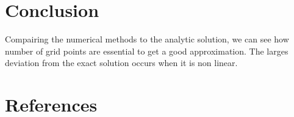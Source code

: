 \documentclass{article}
\begin{document}
\section{Conclusion}
Compairing the numerical methods to the analytic solution, we can see how number of grid points are essential to get a good approximation. The larges deviation from the exact solution occurs when it is non linear. 

\section{References}
\end{document}

